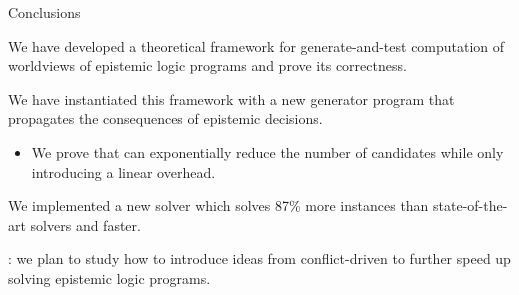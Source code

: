 \documentclass[aspectratio=169,svgnames,xcolor=table,t]{beamer}
\begin{document}
            
\begin{frame}{Conclusions}
    \begin{myitemize}
        \item We have developed a theoretical framework for generate-and-test computation of worldviews of epistemic logic programs and prove its correctness.
        
        \item We have instantiated this framework with a new generator program that propagates the consequences of epistemic decisions.
        \begin{itemize}
            \item We prove that can exponentially reduce the number of candidates while only introducing a linear overhead. 
        \end{itemize}

        \item We implemented a new solver which solves 87\% more instances than state-of-the-art solvers and  faster.
        
        \bigskip
        
        \item {}: we plan to study how to introduce ideas from conflict-driven to further speed up solving epistemic logic programs.
    \end{myitemize}
\end{frame}
\frame{\backcoverpage}
\end{document}
